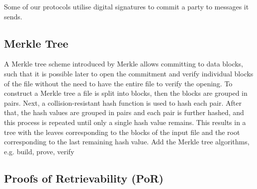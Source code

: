Some of our protocols utilise digital signatures to commit a party to messages it sends. 

\subsection{Merkle Tree}

A Merkle tree scheme introduced by Merkle \cite{DBLP:conf/sp/Merkle80,DBLP:conf/crypto/Merkle89} allows   committing to data blocks, such that it is  possible later to open the commitment and verify individual blocks of the file without the need to have the entire file to verify the opening. To construct a Merkle tree a file is split into blocks, then the blocks are grouped in pairs. Next,   a collision-resistant hash function is used to hash each pair. After that, the hash values are grouped in pairs and each pair is further hashed, and this process is repeated until only a single hash value remains. This results in a  tree with the leaves corresponding to the blocks of the input file and the root corresponding to the last remaining hash value.  {\color{blue} Add the Merkle tree algorithms, e.g. build, prove, verify}


\subsection{Proofs of Retrievability (PoR)}\label{PoR-def}




%


